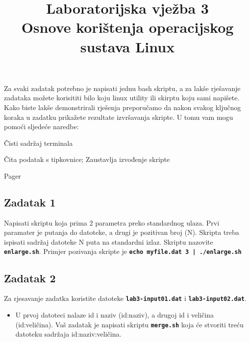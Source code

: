 \documentclass[12pt,a4paper]{article}
\newcommand{\shell}[1]{\texttt{\textbf{#1}}}
\begin{document}
	\title{Laboratorijska vježba 3\\{\small Osnove korištenja operacijskog sustava Linux}\vspace{-2em}}
	\maketitle
	Za svaki zadatak potrebno je napisati jednu bash skriptu, a za lakše rješavanje zadataka možete korisititi bilo koju linux utility ili skirptu koju sami napišete. Kako biste lakše demonstrirali rješenja preporučamo da nakon svakog ključnog koraka u zadatku prikažete rezultate izvršavanja skripte. U tomu vam mogu pomoći sljedeće naredbe:
	\begin{description}[leftmargin=!,labelwidth=4em,itemsep=0em]
		\item[\shell{clear}] Čisti sadržaj terminala
		\item[\shell{read -p}] Čita podatak s tipkovnice; Zaustavlja izvođenje skripte
		\item[\shell{less}] Pager
	\end{description}
	
  \subsection*{Zadatak 1}
  Napisati skriptu koja prima 2 parametra preko standardnog ulaza. Prvi paramater je putanja do datoteke, a drugi je pozitivan broj (N).
  Skripta treba ispisati sadržaj datoteke N puta na standardni izlaz. Skriptu nazovite \shell{enlarge.sh}. Primjer pozivanja skripte je \shell{echo myfile.dat 3 | ./enlarge.sh}

	\subsection*{Zadatak 2}
  Za rjesavanje zadatka koristite datoteke \shell{lab3-input01.dat} i \shell{lab3-input02.dat}.
	\begin{itemize}
    \item U prvoj datoteci nalaze id i naziv (id:naziv), a drugoj id i veličina (id:veličina). Vaš zadatak je napisati skriptu \shell{merge.sh} koja će stvoriti treću datoteku sadržaja id:naziv:veličina.
	\end{itemize}
	
\end{document}
